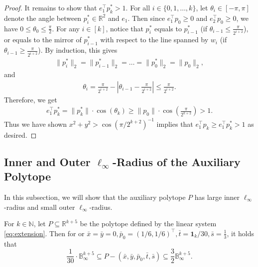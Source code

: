 \documentclass{article}\usepackage[a4paper,margin=20mm]{geometry}
\newcommand{\R}{\mathbb R}
\newcommand{\N}{\mathbb N}
\newcommand{\T}{\top}
\renewcommand{\subset}{\subseteq}
\begin{document}
\begin{proof}
It remains to show that $e_1^\top p_k^* > 1$.
For all $i \in \{0, 1, \ldots, k\}$, let $\theta_i \in [-\pi, \pi]$ denote the angle between $p_i^* \in \R^2$ and $e_1$. Then since $e_1^\top p_0 \geq 0$ and $e_2^\top p_0 \geq 0$, we have $0 \leq \theta_0 \leq \frac{\pi}{2}$.
For any $i \in [k]$, notice that $p_i^*$ equals to $p_{i-1}^*$ (if $\theta_{i-1} \leq \frac{\pi}{2^{i+2}}$), or equals to the mirror of $p_{i-1}^*$ with respect to the line spanned by $w_i$ (if $\theta_{i-1} \geq \frac{\pi}{2^{i+2}}$). By induction, this gives 
\begin{align*}
    \|p_i^*\|_2 = \|p_{i-1}^*\|_2 = \ldots = \|p_0^*\|_2 = \|p_0\|_2,
\end{align*}
and
\begin{align*}
    \theta_{i} = \frac{\pi}{2^{i+2}} - |\theta_{i-1} - \frac{\pi}{2^{i+2}}| \leq \frac{\pi}{2^{i+2}}.
\end{align*}
Therefore, we get
\begin{align*}
    e_1^\top p_k^* = \|p_k^*\| \cdot \cos(\theta_k) \geq \|p_0\| \cdot \cos\left(\frac{\pi}{2^{k + 2}}\right) > 1.
\end{align*}
Thus we have shown $x^2 + y^2 > \cos(\pi/2^{k+2})^{-1}$ implies that $e_1^\T p_k \geq e_1^\T p_k^* > 1$
as desired.
\end{proof}



\subsection{Inner and Outer \texorpdfstring{$\ell_{\infty}$}{l\_infty}-Radius of the Auxiliary Polytope}\label{sec:lb-radius-P}

In this subsection, we will show that the auxiliary polytope $P$ has large inner $\ell_\infty$-radius and small outer $\ell_\infty$-radius.

\begin{lemma}\label{lem:lb-radius-P}
For $k \in \N$, let $P \subset \R^{k+5}$ be the polytope defined by the linear system \eqref{eq:extension}.
Then for or $\bar x = \bar y = 0, \bar{p}_0 = (1/6,1/6)^\top, \bar t  = \mathbf{1}_{k}/30, \bar{s} = \frac{1}{3}$, it holds that
\[
    \frac{1}{30}\cdot \mathbb{B}_\infty^{k+5} \subset P - (\bar x, \bar y, \bar{p}_0, \bar t, \bar{s}) \subset \frac 3 2 \mathbb{B}_\infty^{k+5}.
\]
\end{lemma}
\end{document}
